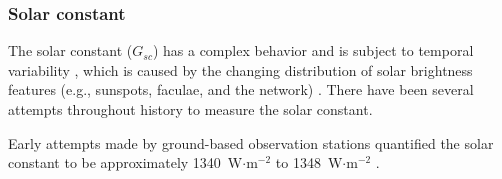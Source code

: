 \subsubsection{Solar constant}
\label{sec:gsc}
The solar constant ($G_{sc}$) has a complex behavior and is subject to temporal variability \parencite{crommelynck97}, which is caused by the changing distribution of solar brightness features (e.g., sunspots, faculae, and the network) \parencite{krivova10}. 
There have been several attempts throughout history to measure the solar constant. 

Early attempts made by ground-based observation stations quantified the solar constant to be approximately 1340~W$\cdot$m$^{-2}$ \parencite{abbot11} to 1348~W$\cdot$m$^{-2}$ \parencite{abbot14}.

